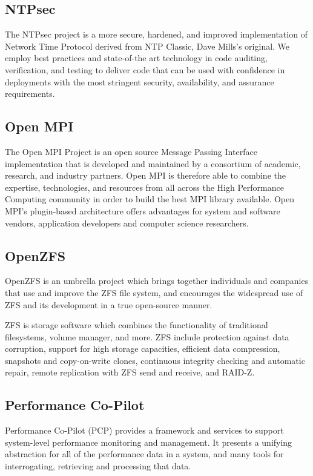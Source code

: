 \documentclass[letterpaper]{report}
\begin{document}
\subsection{NTPsec}

The NTPsec project is a more secure, hardened, and improved
implementation of Network Time Protocol derived from NTP Classic, Dave
Mills's original. We employ best practices and state-of-the art
technology in code auditing, verification, and testing to deliver code
that can be used with confidence in deployments with the most stringent
security, availability, and assurance requirements.

\subsection{Open MPI}

The Open MPI Project is an open source Message Passing Interface
implementation that is developed and maintained by a consortium of
academic, research, and industry partners. Open MPI is therefore able to
combine the expertise, technologies, and resources from all across the
High Performance Computing community in order to build the best MPI
library available. Open MPI's plugin-based architecture offers
advantages for system and software vendors, application developers and
computer science researchers.

\subsection{OpenZFS}

OpenZFS is an umbrella project which brings together individuals and
companies that use and improve the ZFS file system, and encourages the
widespread use of ZFS and its development in a true open-source manner.

ZFS is storage software which combines the functionality of traditional
filesystems, volume manager, and more. ZFS include protection against
data corruption, support for high storage capacities, efficient data
compression, snapshots and copy-on-write clones, continuous integrity
checking and automatic repair, remote replication with ZFS send and
receive, and RAID-Z.

\subsection{Performance Co-Pilot}

Performance Co-Pilot (PCP) provides a framework and services to support
system-level performance monitoring and management. It presents a
unifying abstraction for all of the performance data in a system, and
many tools for interrogating, retrieving and processing that data.
\end{document}
